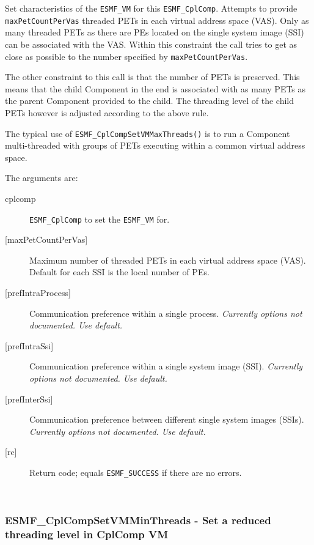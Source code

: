      Set characteristics of the {\tt ESMF\_VM} for this {\tt ESMF\_CplComp}.
     Attempts to provide {\tt maxPetCountPerVas} threaded PETs in each
     virtual address space (VAS). Only as many threaded PETs as there are PEs
     located on the single system image (SSI) can be associated with the VAS.
     Within this constraint the call tries to get as close as possible to the
     number specified by {\tt maxPetCountPerVas}.
  
     The other constraint to this call is that the number of PETs is preserved.
     This means that the child Component in the end is associated with as many
     PETs as the parent Component provided to the child. The threading level of
     the child PETs however is adjusted according to the above rule.
  
     The typical use of {\tt ESMF\_CplCompSetVMMaxThreads()} is to run a
     Component multi-threaded with groups of PETs executing within a common
     virtual address space.
  
   The arguments are:
   \begin{description}
   \item[cplcomp]
     {\tt ESMF\_CplComp} to set the {\tt ESMF\_VM} for.
   \item[{[maxPetCountPerVas]}]
     Maximum number of threaded PETs in each virtual address space (VAS).
     Default for each SSI is the local number of PEs.
   \item[{[prefIntraProcess]}]
     Communication preference within a single process.
     {\em Currently options not documented. Use default.}
   \item[{[prefIntraSsi]}]
     Communication preference within a single system image (SSI).
     {\em Currently options not documented. Use default.}
   \item[{[prefInterSsi]}]
     Communication preference between different single system images (SSIs).
     {\em Currently options not documented. Use default.}
   \item[{[rc]}]
     Return code; equals {\tt ESMF\_SUCCESS} if there are no errors.
   \end{description}
   
 
\mbox{}\hrulefill\ 
 
\subsubsection [ESMF\_CplCompSetVMMinThreads] {ESMF\_CplCompSetVMMinThreads - Set a reduced threading level in CplComp VM}


